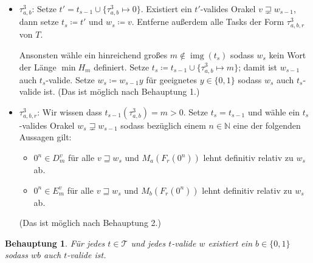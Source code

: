 \documentclass[nofonts]{uebung}
\newtheorem{claim}[theorem]{Behauptung}
\DeclareMathOperator{\img}{img}
\begin{document}
\begin{itemize}
    \item $\tau^3_{a,b}$: Setze $t'=t_{s-1}\cup\{\tau^3_{a,b}\mapsto 0\}$. Existiert ein $t'$-valides Orakel $v\sqsupsetneq w_{s-1}$, dann setze $t_s\coloneqq t'$ und $w_s\coloneqq v$. Entferne außerdem alle Tasks der Form $\tau^3_{a,b,r}$ von $T$.

        Ansonsten wähle ein hinreichend großes $m\not\in \img(t_s)$ sodass $w_s$ kein Wort der Länge $\min H_m$ definiert. Setze $t_s\coloneqq t_{s-1}\cup \{ \tau^3_{a,b}\mapsto m \}$; damit ist $w_{s-1}$ auch $t_s$-valide. Setze $w_s\coloneqq w_{s-1}y$ für geeignetes $y\in\{0,1\}$ sodass $w_s$ auch $t_s$-valide ist. (Das ist möglich nach Behauptung 1.)

    \item $\tau^3_{a,b,r}$: Wir wissen dass $t_{s-1}(\tau^3_{a,b})=m>0$. Setze $t_s=t_{s-1}$ und wähle ein $t_s$-valides Orakel $w_s\sqsupsetneq w_{s-1}$ sodass bezüglich einem $n\in\mathbb N$ eine der folgenden Aussagen gilt:
        \begin{itemize}[nosep,endpenalty=10000]
            \item $0^n\in D_m^v$ für alle $v\sqsupseteq w_s$ und $M_a(F_r(0^n))$ lehnt definitiv relativ zu $w_s$ ab.
            \item $0^n\in E_m^v$ für alle $v\sqsupseteq w_s$ und $M_b(F_r(0^n))$ lehnt definitiv relativ zu $w_s$ ab.
        \end{itemize} (Das ist möglich nach Behauptung 2.)
\end{itemize}

\begin{claim}
    Für jedes $t\in\mathcal T$ und jedes $t$-valide $w$ existiert ein $b\in\{0,1\}$ sodass $wb$ auch $t$-valide ist.
\end{claim}
\end{document}
